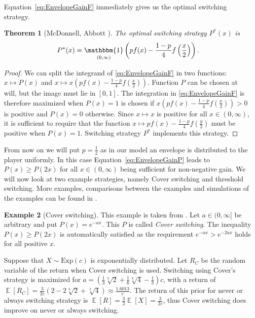 \documentclass[a4paper]{report}
\theoremstyle{plain}
\newtheorem{theorem}{Theorem}[section]
\theoremstyle{definition}
\newtheorem{example}[theorem]{Example}
\theoremstyle{remark}
\numberwithin{equation}{chapter}
\DeclareMathOperator{\E}{\mathbb{E}}
\DeclareMathOperator{\1}{\mathbbm{1}}
\begin{document}
Equation~\ref{eq:EnvelopeGainF} immediately gives us the optimal switching strategy.
\begin{theorem}[McDonnell, Abbott \cite{McDonnell09}]\label{thm:switchopt}
The optimal switching strategy $P^*(x)$ is
\begin{equation}
P^*(x)=\1_{(0,\infty)}\left(pf(x)-\frac{1-p}{4}f\left(\frac{x}{2}\right)\right).\end{equation}
\end{theorem}
\begin{proof}
We can split the integrand of \eqref{eq:EnvelopeGainF} in two functions: $x\mapsto P(x)$ and $x\mapsto x\left(pf(x)-\frac{1-p}{4}f\left(\frac{x}{2}\right)\right)$. Function $P$ can be chosen at will, but the image must lie in $[0,1]$. The integration in \eqref{eq:EnvelopeGainF} is therefore maximized when $P(x)=1$ is chosen if $x\left(pf(x)-\frac{1-p}{4}f\left(\frac{x}{2}\right)\right)>0$ is positive and $P(x)=0$ otherwise. Since $x\mapsto x$ is positive for all $x\in(0,\infty)$, it is sufficient to require that the function $x\mapsto pf(x)-\frac{1-p}{4}f\left(\frac{y}{2}\right)$ must be positive when $P(x)=1$. Switching strategy $P^*$ implements this strategy.
\end{proof}

From now on we will put $p=\frac{1}{2}$ as in our model an envelope is  distributed to the player uniformly. In this case Equation~\ref{eq:EnvelopeGainP} leads to $P(x)\geq P(2x)$ for all $x\in(0,\infty)$ being sufficient for non-negative gain. We will now look at two example strategies, namely Cover switching and threshold switching. More examples, comparisons between the examples and simulations of the examples can be found in \cite{McDonnell09,McDonnell11}.

\begin{example}[Cover switching]
This example is taken from \cite{McDonnell09,Abbott10}. Let $a\in(0,\infty]$ be arbitrary and put $P(x)=e^{-ax}$. This $P$ is called \emph{Cover switching}. The inequality $P(x)\geq P(2x)$ is automatically satisfied as the requirement $e^{-ax}>e^{-2ax}$ holds for all positive $x$.

Suppose that $X\sim\mathrm{Exp}(c)$ is exponentially distributed. Let $R_C$ be the random variable of the return when Cover switching is used. Switching using Cover's strategy is maximized for $a=\left(\frac{1}{3}\sqrt[3]{2}+\frac{1}{6}\sqrt[3]{4}-\frac{1}{3}\right)c$, with a return of $\E[R_C]=\frac{3}{2c}\left(2-2\sqrt[3]{2}+\sqrt[3]{4}\right)\approx\frac{1.6013}{c}$. The return of this prior for never or always switching strategy is $\E[R]=\frac{3}{2}\E[X]=\frac{3}{2c}$, thus Cover switching does improve on never or always switching.
\end{example}
\end{document}
